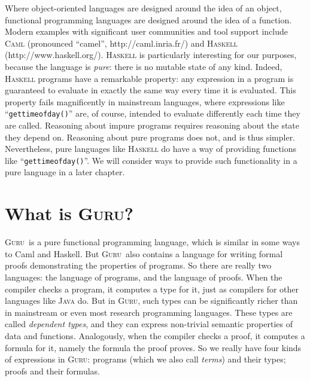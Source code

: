 \documentclass{book}[12pt]
\newcommand{\guru}[0]{\textsc{Guru}}
\begin{document}
Where object-oriented languages are designed around the idea of an
object, functional programming languages are designed around the idea
of a function.  Modern examples with significant user communities and
tool support include \textsc{Caml} (pronounced ``camel'',
http://caml.inria.fr/) and \textsc{Haskell} (http://www.haskell.org/).
\textsc{Haskell} is particularly interesting for our purposes, because
the language is \emph{pure}: there is no mutable state of any kind.
Indeed, \textsc{Haskell} programs have a remarkable property: any
expression in a program is guaranteed to evaluate in exactly the same
way every time it is evaluated.  This property fails magnificently in
mainstream languages, where expressions like
``\texttt{gettimeofday()}'' are, of course, intended to evaluate
differently each time they are called.  Reasoning about impure
programs requires reasoning about the state they depend on.  Reasoning
about pure programs does not, and is thus simpler.  Nevertheless, pure
languages like \textsc{Haskell} do have a way of providing functions
like ``\texttt{gettimeofday()}''.  We will consider ways to provide
such functionality in a pure language in a later chapter.

\section{What is \guru?}

\guru\ is a pure functional programming language, which is similar in
some ways to Caml and Haskell.  But \guru\ also contains a language
for writing formal proofs demonstrating the properties of programs.
So there are really two languages: the language of programs, and the
language of proofs.  When the compiler checks a program, it computes a
type for it, just as compilers for other languages like \textsc{Java}
do.  But in \guru, such types can be significantly richer than in
mainstream or even most research programming languages.  These types
are called \emph{dependent types}, and they can express non-trivial
semantic properties of data and functions.  Analogously, when the
compiler checks a proof, it computes a formula for it, namely the
formula the proof proves.  So we really have four kinds of expressions
in \guru: programs (which we also call \emph{terms}) and their types;
proofs and their formulas.
\end{document}
